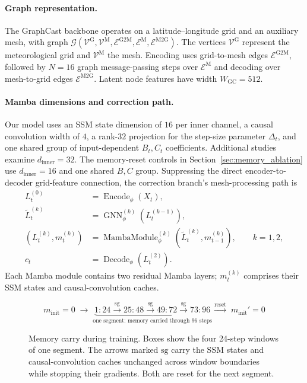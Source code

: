 \documentclass{article}
\newcommand{\vfourchange}[1]{{\color{blue}#1}}
\begin{document}
\paragraph{Graph representation.}
\vfourchange{The GraphCast backbone operates on a latitude--longitude grid and an auxiliary mesh, with graph $\mathcal{G}(\mathcal{V}^{\textrm{G}},\mathcal{V}^{\textrm{M}},\mathcal{E}^{\textrm{G2M}},\mathcal{E}^{\textrm{M}},\mathcal{E}^{\textrm{M2G}})$. The vertices $\mathcal{V}^{\textrm{G}}$ represent the meteorological grid and $\mathcal{V}^{\textrm{M}}$ the mesh. Encoding uses grid-to-mesh edges $\mathcal{E}^{\textrm{G2M}}$, followed by $N=16$ graph message-passing steps over $\mathcal{E}^{\textrm{M}}$ and decoding over mesh-to-grid edges $\mathcal{E}^{\textrm{M2G}}$. Latent node features have width $W_{\textrm{GC}}=512$.}

\paragraph{Mamba dimensions and correction path.}
\vfourchange{Our model uses an SSM state dimension of $16$ per inner channel, a causal convolution width of $4$, a rank-$32$ projection for the step-size parameter $\Delta_t$, and one shared group of input-dependent $B_t,C_t$ coefficients. Additional studies examine $d_{\mathrm{inner}}=32$. The memory-reset controls in Section~\ref{sec:memory_ablation} use $d_{\mathrm{inner}}=16$ and one shared $B,C$ group.}
\vfourchange{Suppressing the direct encoder-to-decoder grid-feature connection, the correction branch's mesh-processing path is}
\begin{align}
    L_t^{(0)} &= \operatorname{Encode}_\phi(X_t),\\
    \widetilde{L}_t^{(k)} &= \operatorname{GNN}^{(k)}_\phi(L_t^{(k-1)}),\\
    (L_t^{(k)},m_t^{(k)})
    &=\operatorname{MambaModule}^{(k)}_\phi
       (\widetilde{L}_t^{(k)},m_{t-1}^{(k)}),\qquad k=1,2,\\
    c_t &= \operatorname{Decode}_\phi(L_t^{(2)}).
\end{align}
\vfourchange{Each Mamba module contains two residual Mamba layers; $m_t^{(k)}$ comprises their SSM states and causal-convolution caches.}

\begin{figure}[!htbp]
    \centering
    \normalsize
    \[
    m_{\mathrm{init}}=0\;\longrightarrow\;
    \underbrace{
      \boxed{1{:}24}
      \xrightarrow{\mathrm{sg}}\boxed{25{:}48}
      \xrightarrow{\mathrm{sg}}\boxed{49{:}72}
      \xrightarrow{\mathrm{sg}}\boxed{73{:}96}
    }_{\text{one segment: memory carried through 96 steps}}
    \xrightarrow{\mathrm{reset}}\;m_{\mathrm{init}}'=0
    \]
    \caption{Memory carry during training. Boxes show the four 24-step windows of one segment. The arrows marked $\mathrm{sg}$ carry the SSM states and causal-convolution caches unchanged across window boundaries while stopping their gradients. Both are reset for the next segment.}
    \label{fig:training_segments}
\end{figure}
\end{document}
